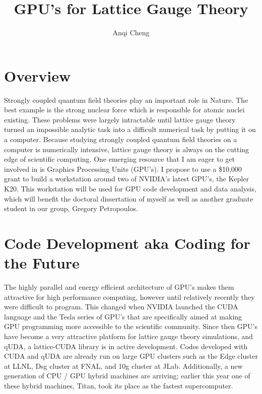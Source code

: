 \documentclass[11pt]{article}
\begin{document}
  \title{GPU's for Lattice Gauge Theory}
  \author{Anqi Cheng}
  \maketitle

  \section*{Overview} %
  Strongly coupled quantum field theories play an important role in Nature.
  The best example is the strong nuclear force which is responsible for atomic nuclei existing.
  These problems were largely intractable until lattice gauge theory turned an impossible analytic task into a difficult numerical task by putting it on a computer.
  Because studying strongly coupled quantum field theories  on a computer is numerically intensive, lattice gauge theory is always on the cutting edge of scientific computing.
  One emerging resource that I am eager to get involved in is Graphics Processing Units (GPU's).   
  I propose to use a \$10,000 grant to build a workstation around two of NVIDIA's latest GPU's, the Kepler K20.  
  This workstation will be used for GPU code development and data analysis, which will benefit the doctoral dissertation of myself as well as another 
  graduate student in our group, Gregory Petropoulos. 
  
  \section*{Code Development aka Coding for the Future} %
  The highly parallel and energy efficient architecture of GPU's makes them attractive for high performance computing, however until relatively recently they were difficult to program.
  This changed when NVIDIA launched the CUDA language and the Tesla series of GPU's that are specifically aimed at making GPU programming more accessible to the scientific community.
  Since then GPU's have become a very attractive platform for lattice gauge theory simulations, and qUDA, a lattice-CUDA library \cite{QUDA1,QUDA2,QUDA3} is in active development.
  Codes developed with CUDA and qUDA are already run on large GPU clusters such as the Edge cluster at LLNL, Dsg cluster at FNAL, and 10g cluster at JLab.
  Additionally, a new generation of CPU / GPU hybrid machines are arriving; earlier this year one of these hybrid machines, Titan, took its place as the fastest supercomputer.
  
\end{document}
